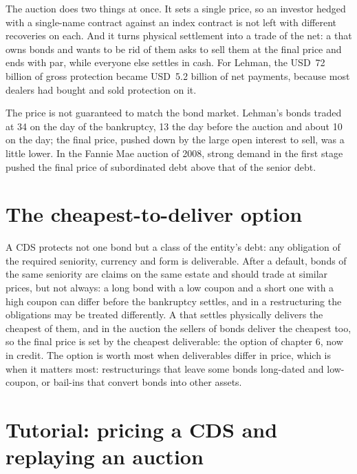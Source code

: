 The auction does two things at once. It sets a single price, so an investor hedged
with a single-name contract against an index contract is not left with different
recoveries on each. And it turns physical settlement into a trade of the net: a
 that owns bonds and wants to be rid of them asks to sell them at the
final price and ends with par, while everyone else settles in cash. For Lehman, the
USD~72 billion of gross protection became USD~5.2 billion of net payments, because most
dealers had bought and sold protection on it.

The price is not guaranteed to match the bond market. Lehman's bonds traded at 34 on
the day of the bankruptcy, 13 the day before the auction and about 10 on the day;
the final price, pushed down by the large open interest to sell, was a little lower. In the Fannie Mae auction of 2008, strong demand in the
first stage pushed the final price of subordinated debt above that of the senior debt.

\section{The cheapest-to-deliver option}

A CDS protects not one bond but a class of the entity's debt: any obligation of the
required seniority, currency and form is deliverable. After a default, bonds of the
same seniority are claims on the same estate and should trade at similar prices, but
not always: a long bond with a low coupon and a short one with a high coupon can
differ before the bankruptcy settles, and in a restructuring the obligations may be
treated differently. A  that settles physically delivers the cheapest
of them, and in the auction the sellers of bonds deliver the cheapest too, so the
final price is set by the cheapest deliverable: the  option of
chapter 6, now in credit. The option is worth most when deliverables differ in price,
which is when it matters most: restructurings that leave some bonds long-dated and
low-coupon, or bail-ins that convert bonds into other assets.

\section{Tutorial: pricing a CDS and replaying an auction}\label{tut:m2:credit-default-swaps:cds}

